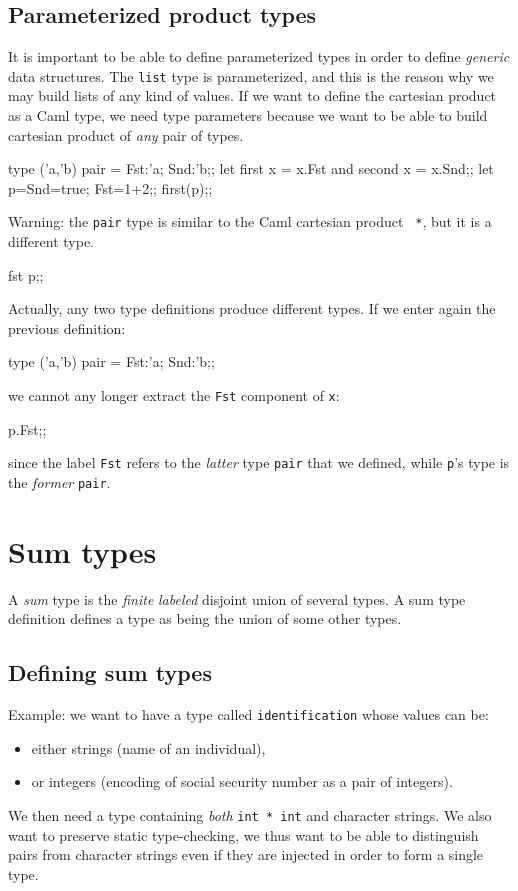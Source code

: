 \subsection{Parameterized product types}

It is important to be able to define parameterized types in order to
define {\em generic} data structures. The {\tt list} type is parameterized,
and this is the reason why we may build lists of any kind of values.
If we want to define the cartesian product as a Caml type, we need type
parameters because we want to be able to build cartesian product of {\em
any} pair of types.
\begin{caml_example}
type ('a,'b) pair = {Fst:'a; Snd:'b};;
let first x = x.Fst and second x = x.Snd;;
let p={Snd=true; Fst=1+2};;
first(p);;
\end{caml_example}
Warning: the {\tt pair} type is similar to the Caml cartesian product {\tt
*}, but it is a different type.
\begin{caml_example}
fst p;;
\end{caml_example}
Actually, any two type definitions produce different types. If we
enter again the previous definition:
\begin{caml_example}
type ('a,'b) pair = {Fst:'a; Snd:'b};;
\end{caml_example}
we cannot any longer extract the {\tt Fst} component of {\tt x}:
\begin{caml_example}
p.Fst;;
\end{caml_example}
since the label {\tt Fst} refers to the {\em latter} type {\tt pair} that we
defined, while {\tt p}'s type is the {\em former} {\tt pair}.

\section{Sum types}

A {\em sum} type is the {\em finite} {\em labeled} disjoint union of
several types.
A sum type definition defines a type as being the union of some other types.%

\subsection{Defining sum types}

Example: we want to have a type called {\tt identification} whose
values can be:
\begin{itemize}
\item either strings (name of an individual),
\item or integers (encoding of social security number as a pair of integers).
\end{itemize}
We then need a type containing {\em both} \verb|int * int| and
character strings.  We also want to preserve static type-checking, we
thus want to be able to distinguish pairs from character strings
even if they are injected in order to form a single type.

